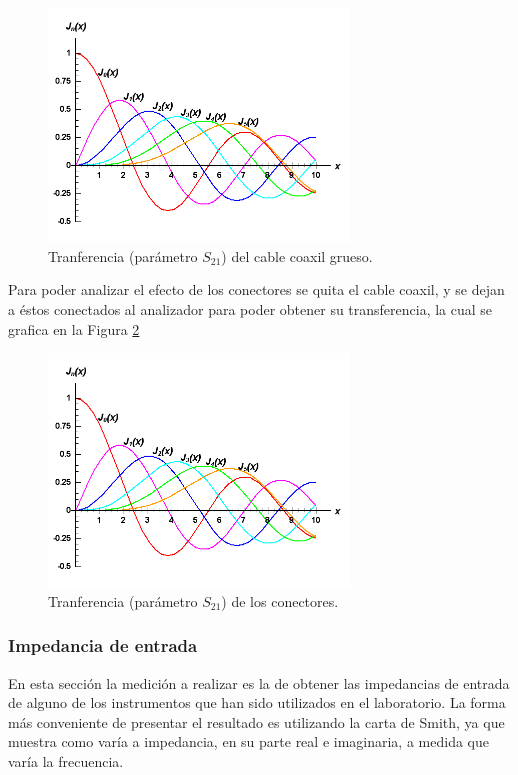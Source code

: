 \documentclass[a4paper,10pt]{article}
\begin{document}
		\begin{figure}[!htb]
			\centering
			\includegraphics[width=8cm]
			{Imagenes/bessel.png}
			\caption{Tranferencia (par\'ametro $S_{21}$) del cable coaxil 
			grueso.}
			\label{coaxilgordo} 
		\end{figure}

		\indent Para poder analizar el efecto de los conectores se quita el 
		cable coaxil, y se dejan a \'estos conectados al analizador para poder 
		obtener su transferencia, la cual se grafica en la Figura 
		\ref{tranferenciaconectorrr}
		
		\begin{figure}[!htb]
			\centering
			\includegraphics[width=8cm]
			{Imagenes/bessel.png}
			\caption{Tranferencia (par\'ametro $S_{21}$) de los conectores.}
			\label{tranferenciaconectorrr} 
		\end{figure}
		
		\subsubsection{Impedancia de entrada}
		\indent En esta secci\'on la medici\'on a realizar es la de obtener las 
		impedancias de entrada de alguno de los instrumentos que han sido 
		utilizados en el laboratorio. La forma m\'as conveniente de presentar el
		resultado es utilizando la carta de Smith, ya que muestra como var\'ia a
		impedancia, en su parte real e  imaginaria, a medida que var\'ia la 
		frecuencia.
		
\end{document}
